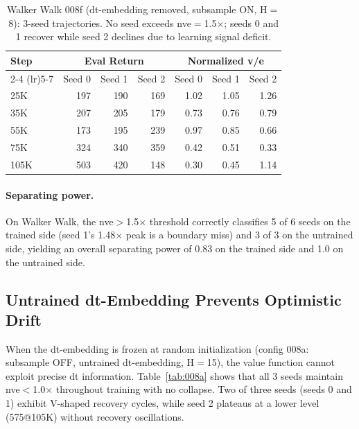 \documentclass[letterpaper]{article}
\begin{document}
\begin{table}[t]
\centering
\caption{Walker Walk 008f (dt-embedding removed, subsample ON, H$=$8): 3-seed trajectories. No seed exceeds nve$=$1.5$\times$; seeds 0 and 1 recover while seed 2 declines due to learning signal deficit.}
\label{tab:008f_trajectory}
\small
\begin{tabular}{lrrrrrr}
\toprule
Step & \multicolumn{3}{c}{Eval Return} & \multicolumn{3}{c}{Normalized v/e} \\
\cmidrule(lr){2-4} \cmidrule(lr){5-7}
& Seed 0 & Seed 1 & Seed 2 & Seed 0 & Seed 1 & Seed 2 \\
\midrule
25K & 197 & 190 & 169 & 1.02 & 1.05 & 1.26 \\
35K & 207 & 205 & 179 & 0.73 & 0.76 & 0.79 \\
55K & 173 & 195 & 239 & 0.97 & 0.85 & 0.66 \\
75K & 324 & 340 & 359 & 0.42 & 0.51 & 0.33 \\
105K & 503 & 420 & 148 & 0.30 & 0.45 & 1.14 \\
\bottomrule
\end{tabular}
\end{table}

\paragraph{Separating power.}
On Walker Walk, the nve$>$1.5$\times$ threshold correctly classifies 5 of 6 seeds on the trained side (seed 1's 1.48$\times$ peak is a boundary miss) and 3 of 3 on the untrained side, yielding an overall separating power of 0.83 on the trained side and 1.0 on the untrained side.

\subsection{Untrained dt-Embedding Prevents Optimistic Drift}
\label{sec:results_c3}

When the dt-embedding is frozen at random initialization (config 008a: subsample OFF, untrained dt-embedding, H$=$15), the value function cannot exploit precise dt information.
Table~\ref{tab:008a} shows that all 3 seeds maintain nve$<$1.0$\times$ throughout training with no collapse.
Two of three seeds (seeds 0 and 1) exhibit V-shaped recovery cycles, while seed 2 plateaus at a lower level (575@105K) without recovery oscillations.
\end{document}
